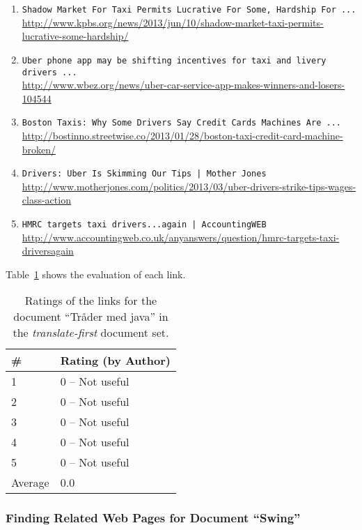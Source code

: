 \begin{enumerate}
\item
    \verb|Shadow Market For Taxi Permits Lucrative For Some, Hardship For ...| \\
    \url{http://www.kpbs.org/news/2013/jun/10/shadow-market-taxi-permits-lucrative-some-hardship/}
\item
    \verb|Uber phone app may be shifting incentives for taxi and livery drivers ...| \\
    \url{http://www.wbez.org/news/uber-car-service-app-makes-winners-and-losers-104544}
\item
    \verb|Boston Taxis: Why Some Drivers Say Credit Cards Machines Are ...| \\
    \url{http://bostinno.streetwise.co/2013/01/28/boston-taxi-credit-card-machine-broken/}
\item
    \verb#Drivers: Uber Is Skimming Our Tips | Mother Jones# \\
    \url{http://www.motherjones.com/politics/2013/03/uber-drivers-strike-tips-wages-class-action}
\item
    \verb#HMRC targets taxi drivers...again | AccountingWEB# \\
    \url{http://www.accountingweb.co.uk/anyanswers/question/hmrc-targets-taxi-driversagain}
\end{enumerate}

Table~\ref{tab:ratings-en-tr-der-med-java} shows the evaluation of each link.
\begin{table}[H]
\centering
\begin{tabular}{|l|l|}
\hline\hline
    \# & Rating (by Author) \\
\hline
    1 & 0 -- Not useful \\
    2 & 0 -- Not useful \\
    3 & 0 -- Not useful \\
    4 & 0 -- Not useful \\
    5 & 0 -- Not useful \\
\hline
    Average & 0.0 \\
\hline\hline
\end{tabular}
\caption{Ratings of the links for the document ``Tråder med java'' in the \textit{translate-first} document set.}
\label{tab:ratings-en-tr-der-med-java}
\end{table}



\subsubsection{Finding Related Web Pages for Document ``Swing''}
\label{subsubsec:en-swing}

